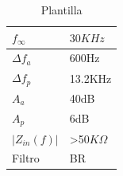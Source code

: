\begin{table}[H]
\begin{center}
\begin{tabular}{|l|l|}
\hline
$f_{\infty}$& $30KHz$\\
\hline \hline
$\Delta f_a$ &600Hz  \\ \hline
$\Delta f_p$ &13.2KHz  \\ \hline
$A_a$ &40dB\\ \hline
$A_p$ &6dB\\ \hline
$ |Z_{in}(f)|$ & >50$K\Omega $\\ \hline
Filtro & BR\\ \hline



\end{tabular}
\caption{Plantilla} 
\end{center}
\end{table}

